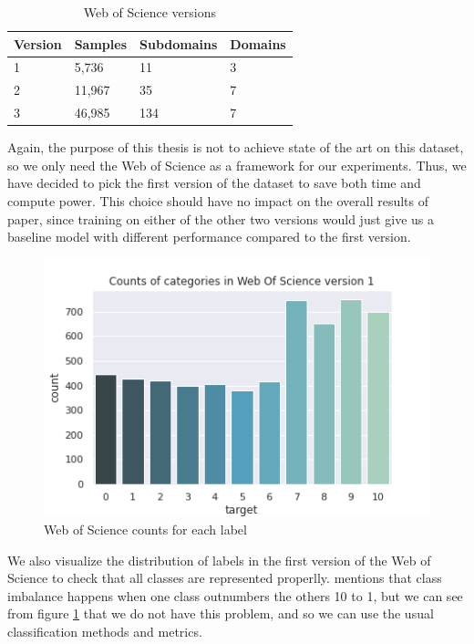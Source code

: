 \documentclass[12pt]{extreport}
\begin{document}
\begin{table}[ht!]
\centering
\begin{tabular}{|l|l|l|l|}
\hline
Version & Samples & Subdomains & Domains \\ \hline
1       & 5,736   & 11         & 3       \\ \hline
2       & 11,967  & 35         & 7       \\ \hline
3       & 46,985  & 134        & 7       \\ \hline
\end{tabular}
\caption{Web of Science versions}
\label{table:wos}
\end{table}

Again, the purpose of this thesis is not to achieve state of the art on this dataset, so we only need the Web of Science as a framework for our experiments. Thus, we have decided to pick the first version of the dataset to save both time and compute power. This choice should have no impact on the overall results of paper, since training on either of the other two versions would just give us a baseline model with different performance compared to the first version.

\begin{figure}[ht!]
\centering
\includegraphics[width=0.8\linewidth]{assets/framework/wos_counts_1.png}
\caption{Web of Science counts for each label}
\label{fig:wos-1}
\end{figure}

We also visualize the distribution of labels in the first version of the Web of Science to check that all classes are represented properlly. \cite{classimbalance} mentions that class imbalance happens when one class outnumbers the others 10 to 1, but we can see from figure \ref{fig:wos-1} that we do not have this problem, and so we can use the usual classification methods and metrics.
\end{document}
